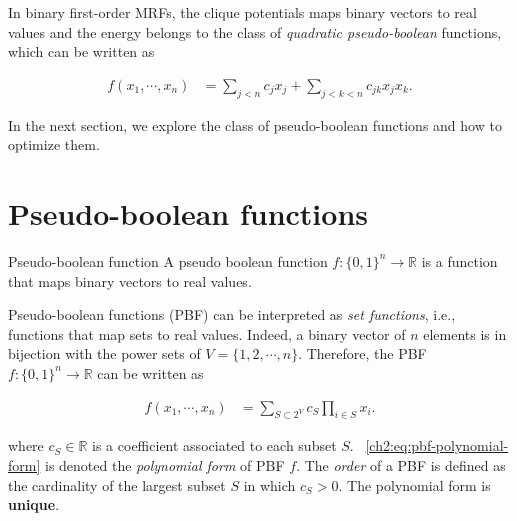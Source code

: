 

In binary first-order MRFs, the clique potentials maps binary vectors to real values and the energy belongs to the class of \emph{quadratic pseudo-boolean} functions, which can be written as

\begin{align*}
	f(x_1,\cdots, x_n) &= \sum_{j < n}{c_jx_j} + \sum_{j<k<n}{c_{jk}x_jx_k}.
\end{align*} 

In the next section, we explore the class of pseudo-boolean functions and how to optimize them.

\section{Pseudo-boolean functions}
\label{ch2:sec:pseudo-boolean-functions}

\begin{definition}{Pseudo-boolean function}
	A pseudo boolean function $f:\{0,1\}^n \rightarrow \mathbb{R}$ is a function that maps binary vectors to real values.
\end{definition}

Pseudo-boolean functions (PBF) can be interpreted as \emph{set functions}, i.e., functions that map sets to real values. Indeed, a binary vector of $n$ elements is in bijection with the power sets of $V = \{1,2,\cdots,n\}$. Therefore, the PBF $f:\{0,1\}^n \rightarrow \mathbb{R}$ can be written as

\begin{align}
	f(x_1,\cdots,x_n) &= \sum_{S \subset 2^{V}}{c_S \prod_{i \in S}{x_i}}.
	\label{ch2:eq:pbf-polynomial-form}
\end{align}

where $c_S \in \mathbb{R}$ is a coefficient associated to each subset $S$. ~\cref{ch2:eq:pbf-polynomial-form} is denoted the \emph{polynomial form} of PBF $f$. The \emph{order} of a PBF is defined as the cardinality of the largest subset $S$ in which $c_S>0$. The polynomial form is \textbf{unique}. 

